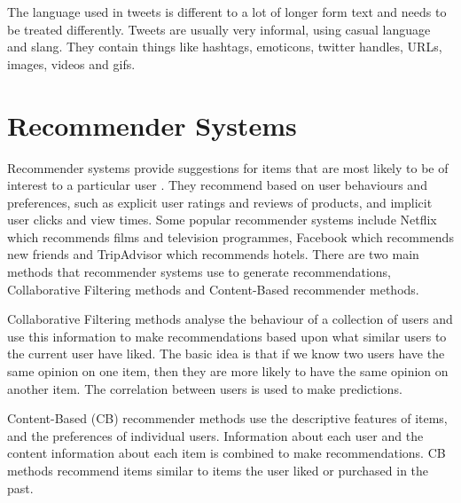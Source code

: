 
The language used in tweets is different to a lot of longer form text and needs to be treated differently. Tweets are usually very informal, using casual language and slang. They contain things like hashtags, emoticons, twitter handles, URLs, images, videos and gifs.

\section{Recommender Systems}
Recommender systems provide suggestions for items that are most likely to be of interest to a particular user \cite{Ricci2015}. They recommend based on user behaviours and preferences, such as explicit user ratings and reviews of products, and implicit user clicks and view times. Some popular recommender systems include Netflix which recommends films and television programmes, Facebook which recommends new friends 
and TripAdvisor which recommends hotels. There are two main methods that recommender systems use to generate recommendations, Collaborative Filtering methods and Content-Based recommender methods. 

Collaborative Filtering methods analyse the behaviour of a collection of users and use this information to make recommendations based upon what similar users to the current user have liked. The basic idea is that if we know two users have the same opinion on one item, then they are more likely to have the same opinion on another item. The correlation between users is used to make predictions.

Content-Based (CB) recommender methods use the descriptive features of items, and the preferences of individual users. Information about each user and the content information about each item is combined to make recommendations. CB methods recommend items similar to items the user liked or purchased in the past.

